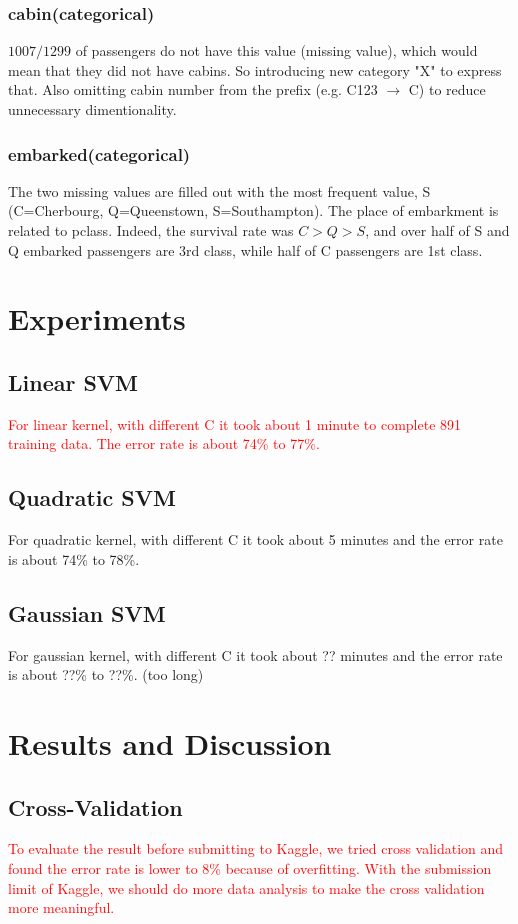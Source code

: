 \documentclass{article}
\begin{document}
\subsubsection*{cabin(categorical)}
$1007/1299$ of passengers do not have this value (missing value), which would mean that they did not have cabins.
So introducing new category "X" to express that.
Also omitting cabin number from the prefix (e.g. C123 $\rightarrow$ C) to reduce unnecessary dimentionality.

\subsubsection*{embarked(categorical)}
The two missing values are filled out with the most frequent value, S (C=Cherbourg, Q=Queenstown, S=Southampton).
The place of embarkment is related to pclass.
Indeed, the survival rate was $C>Q>S$, and over half of S and Q embarked passengers are 3rd class, while half of C passengers are 1st class.

\section{Experiments}
\subsection{Linear SVM}
\textcolor{red}{For linear kernel, with different C it took about 1 minute to complete 891 training data. The error rate is about 74\% to 77\%.}
\subsection{Quadratic SVM}
For quadratic kernel, with different C it took about 5 minutes and the error rate is about 74\% to 78\%. 
\subsection{Gaussian SVM}
For gaussian kernel, with different C it took about ?? minutes and the error rate is about ??\% to ??\%. (too long)

\section{Results and Discussion}
\subsection{Cross-Validation}
\textcolor{red}{To evaluate the result before submitting to Kaggle, we tried cross validation and found the error rate is lower to 8\% because of overfitting. With the submission limit of Kaggle, we should do more data analysis to make the cross validation more meaningful.}
\end{document}
